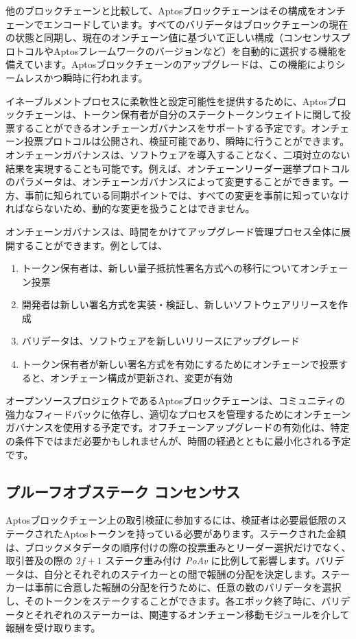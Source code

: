 \documentclass{article}
\begin{document}
他のブロックチェーンと比較して、Aptosブロックチェーンはその構成をオンチェーンでエンコードしています。すべてのバリデータはブロックチェーンの現在の状態と同期し、現在のオンチェーン値に基づいて正しい構成（コンセンサスプロトコルやAptosフレームワークのバージョンなど）を自動的に選択する機能を備えています。Aptosブロックチェーンのアップグレードは、この機能によりシームレスかつ瞬時に行われます。

イネーブルメントプロセスに柔軟性と設定可能性を提供するために、Aptosブロックチェーンは、トークン保有者が自分のステークトークンウェイトに関して投票することができるオンチェーンガバナンスをサポートする予定です。オンチェーン投票プロトコルは公開され、検証可能であり、瞬時に行うことができます。オンチェーンガバナンスは、ソフトウェアを導入することなく、二項対立のない結果を実現することも可能です。例えば、オンチェーンリーダー選挙プロトコルのパラメータは、オンチェーンガバナンスによって変更することができます。一方、事前に知られている同期ポイントでは、すべての変更を事前に知っていなければならないため、動的な変更を扱うことはできません。

オンチェーンガバナンスは、時間をかけてアップグレード管理プロセス全体に展開することができます。例としては、
\begin{enumerate}
\item トークン保有者は、新しい量子抵抗性署名方式への移行についてオンチェーン投票

\item 開発者は新しい署名方式を実装・検証し、新しいソフトウェアリリースを作成

\item バリデータは、ソフトウェアを新しいリリースにアップグレード

\item トークン保有者が新しい署名方式を有効にするためにオンチェーンで投票すると、オンチェーン構成が更新され、変更が有効
\end{enumerate}

オープンソースプロジェクトであるAptosブロックチェーンは、コミュニティの強力なフィードバックに依存し、適切なプロセスを管理するためにオンチェーンガバナンスを使用する予定です。オフチェーンアップグレードの有効化は、特定の条件下ではまだ必要かもしれませんが、時間の経過とともに最小化される予定です。


\subsection{プルーフオブステーク コンセンサス}

Aptosブロックチェーン上の取引検証に参加するには、検証者は必要最低限のステークされたAptosトークンを持っている必要があります。ステークされた金額は、ブロックメタデータの順序付けの際の投票重みとリーダー選択だけでなく、取引普及の際の $2f+1$ ステーク重み付け \emph{PoAv} に比例して影響します。バリデータは、自分とそれぞれのステイカーとの間で報酬の分配を決定します。ステーカーは事前に合意した報酬の分配を行うために、任意の数のバリデータを選択し、そのトークンをステークすることができます。各エポック終了時に、バリデータとそれぞれのステーカーは、関連するオンチェーン移動モジュールを介して報酬を受け取ります。
\end{document}

